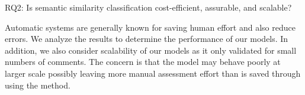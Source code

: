 











\begin{ResearchQuestions}
\item[RQ2:] Is semantic similarity classification cost-efficient, assurable, and scalable?
\end{ResearchQuestions}

Automatic systems are generally known for saving human effort and also reduce errors.
We analyze the results to determine the performance of our models.
In addition, we also consider scalability of our models as it only validated for small numbers of comments. The concern is that the model may behave poorly at larger scale possibly leaving more manual assessment effort than is saved through using the method. 

